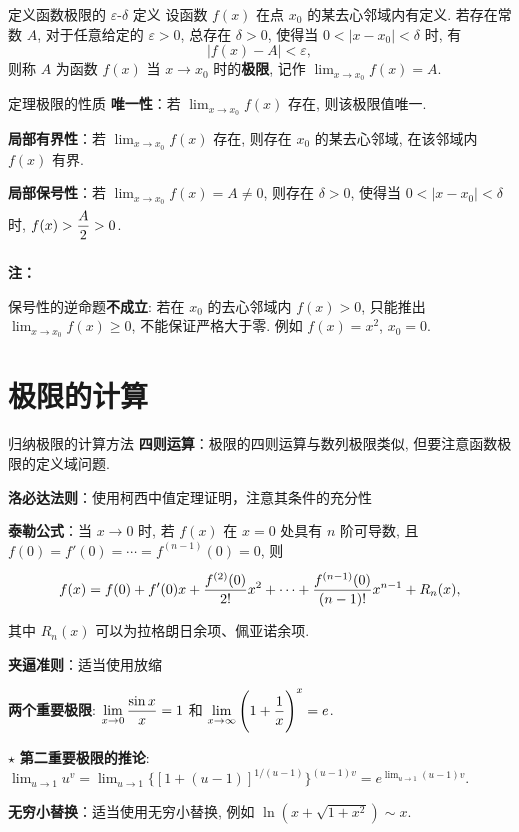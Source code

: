 \documentclass[a4paper,12pt,oneside,fontset=none]{ctexbook}
\renewcommand{\ge}{\geqslant}
\let\olddfrac\dfrac
\renewcommand{\dfrac}[2]{
    \olddfrac{#1\vrule width 0pt height 1.15em depth 0em}{#2\vrule width 0pt height 0em depth 0.6em}
}
\let\oldlim\lim
\renewcommand{\lim}{\displaystyle\oldlim}
\newcounter{theorem}[chapter]
\newenvironment{theorem}[1][]{\begin{thmBox}{定理}{#1}}{\end{thmBox}}
\newenvironment{induction}[1][]{\begin{thmBox}{归纳}{#1}}{\end{thmBox}}
\newcounter{definition}[chapter]
\newenvironment{definition}[1][]{\begin{defBox}{定义}{#1}}{\end{defBox}}
\newenvironment{note}{
    \par\vspace{0.5em}\noindent
    \textbf{\color{NoteColor} 注：}
}{
    \par\vspace{0.5em}
}
\numberwithin{equation}{chapter}
\begin{document}
\begin{definition}[函数极限的 $\varepsilon$-$\delta$ 定义]
设函数 $f(x)$ 在点 $x_0$ 的某去心邻域内有定义. 若存在常数 $A$, 对于任意给定的 $\varepsilon > 0$, 总存在 $\delta > 0$, 使得当 $0 < |x - x_0| < \delta$ 时, 有
\[
    |f(x) - A| < \varepsilon,
\]
则称 $A$ 为函数 $f(x)$ 当 $x \to x_0$ 时的\textbf{极限}, 记作 $\lim_{x \to x_0} f(x) = A$.
\end{definition}

\begin{theorem}[极限的性质]
\textbf{唯一性}：若 $\lim_{x \to x_0} f(x)$ 存在, 则该极限值唯一.

\textbf{局部有界性}：若 $\lim_{x \to x_0} f(x)$ 存在, 则存在 $x_0$ 的某去心邻域, 在该邻域内 $f(x)$ 有界.

\textbf{局部保号性}：若 $\lim_{x \to x_0} f(x) = A \neq 0$, 则存在 $\delta > 0$, 使得当 $0 < |x - x_0| < \delta$ 时, $f(x) > \dfrac{A}{2} > 0$.
\end{theorem}

\begin{note}
保号性的逆命题\textbf{不成立}: 若在 $x_0$ 的去心邻域内 $f(x) > 0$, 只能推出 $\lim_{x \to x_0} f(x) \ge 0$, 不能保证严格大于零. 例如 $f(x) = x^2$, $x_0 = 0$.
\end{note}


\section{极限的计算}
\begin{induction}[极限的计算方法]
\textbf{四则运算}：极限的四则运算与数列极限类似, 但要注意函数极限的定义域问题.

\textbf{洛必达法则}：使用柯西中值定理证明，注意其条件的充分性

\textbf{泰勒公式}：当 $x \to 0$ 时, 若 $f(x)$ 在 $x = 0$ 处具有 $n$ 阶可导数, 且 $f(0) = f'(0) = \cdots = f^{(n-1)}(0) = 0$, 则
\[
    f(x) = f(0) + f'(0)x + \dfrac{f^{(2)}(0)}{2!}x^{2} + \cdots + \dfrac{f^{(n-1)}(0)}{(n-1)!}x^{n-1} + R_n(x),
\]
其中 $R_n(x)$ 可以为拉格朗日余项、佩亚诺余项.

\textbf{夹逼准则}：适当使用放缩

\textbf{两个重要极限}: $\lim_{x \to 0} \dfrac{\sin x}{x} = 1$ 和 $\lim_{x \to \infty}\left(1 + \dfrac{1}{x}\right)^{x} = e$.

$\star$ \textbf{第二重要极限的推论}: $\lim_{u\to1} u^v = \lim_{u\to1}\{[1+(u-1)]^{1/(u-1)}\}^{(u-1)v} = e^{\lim_{u\to1}(u-1)v}.$

\textbf{无穷小替换}：适当使用无穷小替换, 例如 $\ln(x + \sqrt{1+x^2}) \sim x$.
\end{induction}
\end{document}
